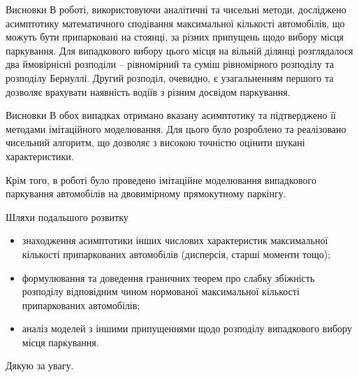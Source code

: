 \begin{frame}{Висновки}
	\manimate
        	В роботі, використовуючи аналітичні та чисельні методи, досліджено асимптотику математичного сподівання максимальної кількості автомобілів, що можуть бути припарковані на стоянці, за різних припущень щодо вибору місця паркування. Для випадкового вибору цього місця на вільній ділянці розглядалося два ймовірнісні розподіли – рівномірний та суміш рівномірного розподілу та розподілу Бернуллі. Другий розподіл, очевидно, є узагальненням першого та дозволяє врахувати наявність водіїв з різним досвідом паркування.

\end{frame}

\begin{frame}{Висновки}
	\manimate
	В обох випадках отримано вказану асимптотику та підтверджено її методами імітаційного моделювання. Для цього було розроблено та реалізовано чисельний алгоритм, що дозволяє з високою точністю оцінити шукані характеристики.
      
        Крім того, в роботі було проведено імітаційне моделювання випадкового паркування автомобілів на двовимірному прямокутному паркінгу.

\end{frame}

\begin{frame}{Шляхи подальшого розвитку}
	\manimate
	\begin{itemize}
		\item знаходження асимптотики інших числових характеристик максимальної кількості припаркованих автомобілів (дисперсія, старші моменти тощо);
		\item формулювання та доведення граничних теорем про слабку збіжність розподілу відповідним чином нормованої максимальної кількості припаркованих автомобілів;
		\item аналіз моделей з іншими припущеннями щодо розподілу випадкового вибору місця паркування. 
	\end{itemize}
\end{frame}

\begin{frame}
	\manimate
	\centering
	\Large Дякую за увагу.

\end{frame}